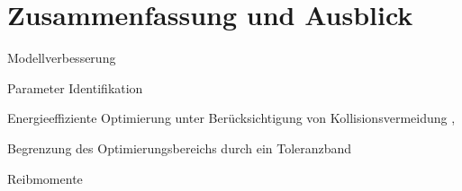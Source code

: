 \chapter{Zusammenfassung und Ausblick}

Modellverbesserung  \cite{Paryanto.2015}

Parameter Identifikation  \cite{Gattringer.2013}

Energieeffiziente Optimierung unter Berücksichtigung von Kollisionsvermeidung  \cite{Bjorkenstam.2013}, \cite{Gleeson.2015}

Begrenzung des Optimierungsbereichs durch ein Toleranzband \cite[S.~55]{Eggers.2019}

Reibmomente \cite[S.~13]{Eggers.2019}

